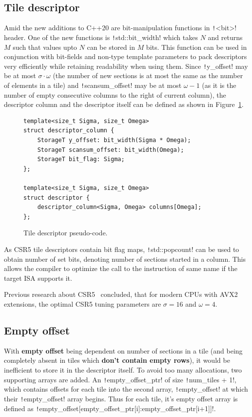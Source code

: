 \documentclass[thesis=M,english]{FITthesis}[2019/12/23]
\newcommand{\csre}[1]{\texttt!#1!}
\begin{document}
\subsection{Tile descriptor}

Amid the new additions to C++20 are bit-manipulation functions in \csre{<bit>} header.
One of the new functions is \csre{std::bit_width} which takes \(N\) and returns \(M\) such that values
upto \(N\) can be stored in \(M\) bits. This function can be used in conjunction with bit-fields
and non-type template parameters to pack descriptors very efficiently while retaining readability when using
them. Since \csre{y_offset} may be at most \(\sigma \cdot \omega\) (the number of new sections is at most the same
as the number of elements in a tile) and \csre{scansum_offset} may be at most \(\omega - 1\) (as it is the number
of empty consecutive columns to the right of current column), the descriptor column and the descriptor
itself can be defined as shown in Figure~\ref{csr5:tileDesc}.

\begin{figure}[htp]

    \begin{verbatim}
template<size_t Sigma, size_t Omega>
struct descriptor_column {
    StorageT y_offset: bit_width(Sigma * Omega);
    StorageT scansum_offset: bit_width(Omega);
    StorageT bit_flag: Sigma;
};

template<size_t Sigma, size_t Omega>
struct descriptor {
    descriptor_column<Sigma, Omega> columns[Omega];
};
    \end{verbatim}
    \caption{Tile descriptor pseudo-code.}\label{csr5:tileDesc}
\end{figure}

As CSR5 tile descriptors contain bit flag maps, \csre{std::popcount} can be used to obtain number of set bits,
denoting number of sections started in a column.
This allows the compiler to optimize the call to the instruction of same name if the target ISA supports it.

Previous research about CSR5~\cite{liu2015csr5} concluded, that for modern CPUs with AVX2 extensions, the optimal CSR5 tuning parameters
are \(\sigma = 16\) and \(\omega = 4\).


\subsection{Empty offset}

With \textbf{empty offset} being dependent on number of sections in a tile (and being completely absent
in tiles which \textbf{don't contain empty rows}), it would be inefficient to
store it in the descriptor itself. To avoid too many allocations, two supporting arrays are added.
An \csre{empty_offset_ptr} of size \csre{num_tiles + 1}, which contains offsets for each tile into the
second array, \csre{empty_offset} at which their \csre{empty_offset} array begins.
Thus for each tile, it's empty offset array is defined as
\csre{empty_offset[empty_offset_ptr[i]:empty_offset_ptr[i+1]]}.
\end{document}

